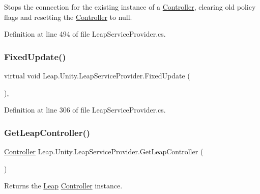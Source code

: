 Stops the connection for the existing instance of a \mbox{\hyperlink{class_leap_1_1_controller}{Controller}}, clearing old policy flags and resetting the \mbox{\hyperlink{class_leap_1_1_controller}{Controller}} to null. 



Definition at line 494 of file Leap\+Service\+Provider.\+cs.

\mbox{\label{class_leap_1_1_unity_1_1_leap_service_provider_a98629de6c901a83829c2210e45b4a41a}} 
\subsubsection{\texorpdfstring{FixedUpdate()}{FixedUpdate()}}
{\footnotesize\ttfamily virtual void Leap.\+Unity.\+Leap\+Service\+Provider.\+Fixed\+Update (\begin{DoxyParamCaption}{ }\end{DoxyParamCaption})\hspace{0.3cm}{\ttfamily [protected]}, {\ttfamily [virtual]}}



Definition at line 306 of file Leap\+Service\+Provider.\+cs.

\mbox{\label{class_leap_1_1_unity_1_1_leap_service_provider_aa146d4e24722ff4b68adeb23e6a1c24e}} 
\subsubsection{\texorpdfstring{GetLeapController()}{GetLeapController()}}
{\footnotesize\ttfamily \mbox{\hyperlink{class_leap_1_1_controller}{Controller}} Leap.\+Unity.\+Leap\+Service\+Provider.\+Get\+Leap\+Controller (\begin{DoxyParamCaption}{ }\end{DoxyParamCaption})}



Returns the \mbox{\hyperlink{namespace_leap_1_1_unity_1_1_leap}{Leap}} \mbox{\hyperlink{class_leap_1_1_controller}{Controller}} instance. 




